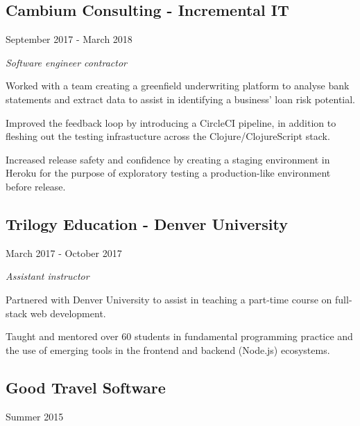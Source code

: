 \vspace{1em}
\begin{minipage}[t]{0.6\textwidth}
  \subsection*{Cambium Consulting - Incremental IT}
\end{minipage}
\noindent\begin{minipage}[t]{0.4\textwidth}
  \flushright
  September 2017 - March 2018
\end{minipage}

\emph{Software engineer contractor}

{\small Worked with a team creating a greenfield underwriting platform to
  analyse bank statements and extract data to assist in identifying a business'
  loan risk potential.

  Improved the feedback loop by introducing a CircleCI pipeline, in addition to
  fleshing out the testing infrastucture across the Clojure/ClojureScript stack.

  Increased release safety and confidence by creating a staging environment in
  Heroku for the purpose of exploratory testing a production-like environment
  before release. }

\vspace{1em}
\noindent\begin{minipage}[t]{0.55\textwidth}
\subsection*{Trilogy Education - Denver University}
\end{minipage}
\noindent\begin{minipage}[t]{0.45\textwidth}
  \flushright
  March 2017 - October 2017
\end{minipage}

\emph{Assistant instructor}

{\small Partnered with Denver University to assist in teaching a part-time
  course on full-stack web development.

  Taught and mentored over 60 students in fundamental programming practice and
  the use of emerging tools in the frontend and backend (Node.js) ecosystems. }

\vspace{1em}
\noindent\begin{minipage}[t]{0.5\textwidth}
  \subsection*{Good Travel Software}
\end{minipage}
\noindent\begin{minipage}[t]{0.5\textwidth}
  \flushright
  Summer 2015
\end{minipage}

